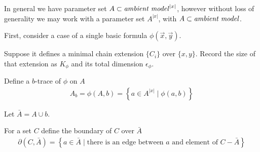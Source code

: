 \documentclass{amsart}
\newcommand{\curly}[1]{\left\{#1\right\}}
\begin{document}



%



In general we have parameter set $A \subset \text{\textit{ambient model}}^{|x|}$, however without loss of generality we may work with
a parameter set $A^{|x|}$, with $A \subset \text{\textit{ambient model}}$.

First, consider a case of a single basic formula $\phi(\vec x, \vec y)$.

Suppose it defines a minimal chain extension $\{C_i\}$ over $\{x, y\}$. 
Record the size of that extension as $K_\phi$ and its total dimension $\epsilon_\phi$.

\begin{Definition}
	Define a $b$-trace of $\phi$ on $A$
	\begin{align*}
		A_b = \phi(A, b) = \curly{a \in A^{|x|} \mid \phi(a, b)}
	\end{align*}
\end{Definition}

Let $\bar A = A \cup b$.

\begin{Definition}
	For a set $C$ define the boundary of $C$ over $\bar A$
	\begin{align*}
		\partial(C, \bar A) = \curly{a \in \bar A \mid \text{there is an edge between $a$ and element of $C - \bar A$}}
	\end{align*}
\end{Definition}
\end{document}
